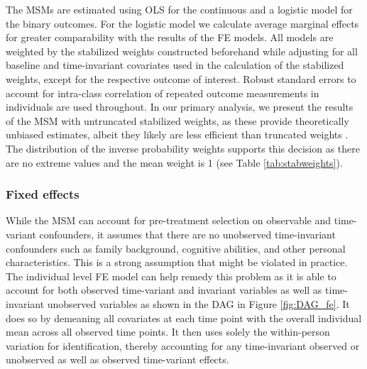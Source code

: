 The \acp{MSM} are estimated using \ac{OLS} for the continuous and a logistic model for the binary outcomes. For the logistic model we calculate average marginal effects for greater comparability with the results of the \ac{FE} models. All models are weighted by the stabilized weights constructed beforehand while adjusting for all baseline and time-invariant covariates used in the calculation of the stabilized weights, except for the respective outcome of interest. Robust standard errors to account for intra-class correlation of repeated outcome measurements in individuals are used throughout. In our primary analysis, we present the results of the \ac{MSM} with untruncated stabilized weights, as these provide theoretically unbiased estimates, albeit they likely are less efficient than truncated weights \parencite{Cole2008}. The distribution of the inverse probability weights supports this decision as there are no extreme values and the mean weight is 1 (see Table \ref{tab:stabweights}).

\subsubsection*{Fixed effects}

While the \ac{MSM} can account for pre-treatment selection on observable and time-variant confounders, it assumes that there are no unobserved time-invariant confounders such as family background, cognitive abilities, and other personal characteristics. This is a strong assumption that might be violated in practice. The individual level \ac{FE} model can help remedy this problem as it is able to account for both observed time-variant and invariant variables as well as time-invariant unobserved variables as shown in the \ac{DAG} in Figure \ref{fig:DAG_fe}. It does so by demeaning all covariates at each time point with the overall individual mean across all observed time points. It then uses solely the within-person variation for identification, thereby accounting for any time-invariant observed or unobserved as well as observed time-variant effects. 


